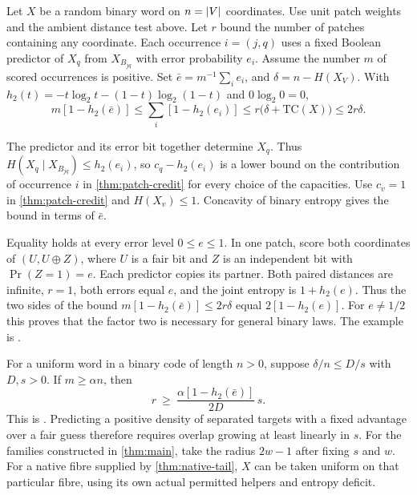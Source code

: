 \begin{corollary}\label{cor:patch-prediction}
Let \(X\) be a random binary word on \(n=\lvert V\rvert\) coordinates.
Use unit patch weights and the ambient distance test above. Let \(r\)
bound the number of patches containing any coordinate. Each occurrence
\(i=(j,q)\) uses a fixed Boolean predictor of \(X_q\) from \(X_{B_{jq}}\)
with error probability \(e_i\). Assume the number \(m\) of scored occurrences is positive. Set
\(\bar e=m^{-1}\sum_i e_i\), and \(\delta=n-H(X_V)\).
With \(h_2(t)=-t\log_2t-(1-t)\log_2(1-t)\) and \(0\log_2 0=0\),
\[
 m[1-h_2(\bar e)]
 \le \sum_i[1-h_2(e_i)]
 \le r\bigl(\delta+\mathrm{TC}(X)\bigr)
 \le 2r\delta .
\]
\end{corollary}
\begin{outline}
The predictor and its error bit together determine \(X_q\). Thus
\(H(X_q\mid X_{B_{jq}})\le h_2(e_i)\), so \(c_q-h_2(e_i)\)
is a lower bound on the contribution of occurrence \(i\) in
\cref{thm:patch-credit} for every choice of the capacities. Use \(c_v=1\) in
\cref{thm:patch-credit} and \(H(X_v)\le1\). Concavity of binary
entropy gives the bound in terms of \(\bar e\).
\end{outline}

Equality holds at every error level \(0\le e\le1\).
In one patch, score both coordinates of \((U,U\mathbin{\oplus}Z)\),
where \(U\) is a fair bit and \(Z\) is an independent bit with
\(\Pr(Z=1)=e\). Each predictor copies its partner. Both paired
distances are infinite, \(r=1\), both errors equal \(e\), and the joint
entropy is \(1+h_2(e)\). Thus the two sides of the bound
\(m[1-h_2(\bar e)]\le2r\delta\) equal \(2[1-h_2(e)]\).
For \(e\ne 1/2\) this proves that the factor two is necessary for general binary laws. The example is .

For a uniform word in a binary code of length \(n>0\), suppose
\(\delta/n\le D/s\) with \(D,s>0\). If \(m\ge\alpha n\), then
\[
 r\ \ge\ \frac{\alpha[1-h_2(\bar e)]}{2D}\,s.
\]
This is .
Predicting a positive density of separated targets with a fixed advantage
over a fair guess therefore requires overlap growing at least linearly
in \(s\). For the families constructed in \cref{thm:main}, take the radius
\(2w-1\) after fixing \(s\) and \(w\). For a native fibre supplied by
\cref{thm:native-tail}, \(X\) can be taken uniform on that particular
fibre, using its own actual permitted helpers and entropy deficit.


